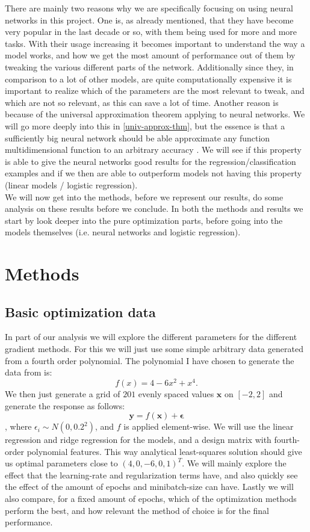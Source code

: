 \documentclass{article}
\begin{document}
There are mainly two reasons why we are specifically focusing on using neural
networks in this project. One is, as already mentioned, that they have become
very popular in the last decade or so, with them being used for more and more
tasks. With their usage increasing it becomes important to understand the way a
model works, and how we get the most amount of performance out of them by
tweaking the various different parts of the network. Additionally since they, in
comparison to a lot of other models, are quite computationally expensive it is
important to realize which of the parameters are the most relevant to tweak, and
which are not so relevant, as this can save a lot of time. Another reason is
because of the universal approximation theorem applying to neural networks. We
will go more deeply into this in \ref{univ-approx-thm}, but the essence is that
a sufficiently big neural network should be able approximate any function
multidimensional function to an arbitrary accuracy
\cite[s.~13.5]{lecutenotes13}. We will see if this property is able to give the
neural networks good results for the regression/classification examples and if
we then are able to outperform models not having this property (linear models /
logistic regression).
\\

We will now get into the methods, before we represent our results, do some
analysis on these results before we conclude. In both the methods and results we
start by look deeper into the pure optimization parts, before going into the
models themselves (i.e. neural networks and logistic regression).

\section{Methods}
\subsection{Basic optimization data}
\label{basicoptdesc}
In part of our analysis we will explore the different parameters for the
different gradient methods. For this we will just use some simple arbitrary data
generated from a fourth order polynomial. The polynomial I have chosen to
generate the data from is:
$$f(x) = 4 - 6 x^2 + x^4.$$
We then just generate a grid of $201$ evenly spaced values $\bm{x}$ on $[-2, 2]$
and generate the response as follows:
$$\bm{y} = f(\bm{x}) + \bm{\epsilon}$$
, where $\epsilon_i \sim N(0, 0.2^2)$, and $f$ is applied element-wise.  We will
use the linear regression and ridge regression for the models, and a
design matrix with fourth-order polynomial features. This way analytical
least-squares solution should give us optimal parameters close to $(4, 0, -6, 0,
      1)^T$. We will mainly explore the effect that the learning-rate and
regularization terms have, and also quickly see the effect of the amount
of epochs and minibatch-size can have. Lastly we will also compare, for a fixed
amount of epochs, which of the optimization methods perform the best, and how
relevant the method of choice is for the final performance.
\end{document}
